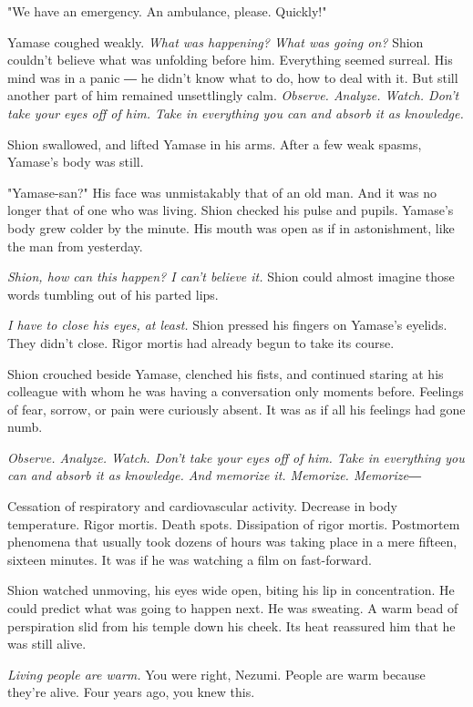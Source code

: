 "We have an emergency. An ambulance, please. Quickly!"

Yamase coughed weakly. \emph{What was happening? What was going on?} Shion
couldn't believe what was unfolding before him. Everything seemed
surreal. His mind was in a panic ― he didn't know what to do, how to
deal with it. But still another part of him remained unsettlingly calm.
\emph{Observe. Analyze. Watch. Don't take your eyes off of him. Take in
	everything you can and absorb it as knowledge.}

Shion swallowed, and lifted Yamase in his arms. After a few weak spasms,
Yamase's body was still.

"Yamase-san?" His face was unmistakably that of an old man. And it was
no longer that of one who was living. Shion checked his pulse and
pupils. Yamase's body grew colder by the minute. His mouth was open as
if in astonishment, like the man from yesterday.

\emph{Shion, how can this happen? I can't believe it.} Shion could almost
imagine those words tumbling out of his parted lips.

\emph{I have to close his eyes, at least.} Shion pressed his fingers on
Yamase's eyelids. They didn't close. Rigor mortis had already begun to
take its course.

Shion crouched beside Yamase, clenched his fists, and continued staring
at his colleague with whom he was having a conversation only moments
before. Feelings of fear, sorrow, or pain were curiously absent. It was
as if all his feelings had gone numb.

\emph{Observe. Analyze. Watch. Don't take your eyes off of him. Take in
	everything you can and absorb it as knowledge. And memorize it.
	Memorize. Memorize―}

Cessation of respiratory and cardiovascular activity. Decrease in body
temperature. Rigor mortis. Death spots. Dissipation of rigor mortis.
Postmortem phenomena that usually took dozens of hours was taking place
in a mere fifteen, sixteen minutes. It was if he was watching a film on
fast-forward.

Shion watched unmoving, his eyes wide open, biting his lip in
concentration. He could predict what was going to happen next. He was
sweating. A warm bead of perspiration slid from his temple down his
cheek. Its heat reassured him that he was still alive.

\emph{Living people are warm.} You were right, Nezumi. People are warm because
they're alive. Four years ago, you knew this.

